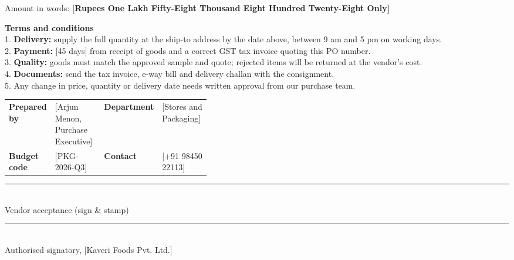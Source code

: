 \documentclass[10pt]{article}
\begin{document}
\par

\vspace{4pt}

Amount in words: \textbf{[Rupees One Lakh Fifty-Eight Thousand Eight Hundred Twenty-Eight Only]}\par\vspace{4pt}

\noindent\colorbox{notebg}{\parbox{\dimexpr\linewidth-2\fboxsep}{\footnotesize {\color{accent}\bfseries Terms and conditions}\\ 1. \textbf{Delivery:} supply the full quantity at the ship-to address by the date above, between 9 am and 5 pm on working days.\\ 2. \textbf{Payment:} [45 days] from receipt of goods and a correct GST tax invoice quoting this PO number.\\ 3. \textbf{Quality:} goods must match the approved sample and quote; rejected items will be returned at the vendor's cost.\\ 4. \textbf{Documents:} send the tax invoice, e-way bill and delivery challan with the consignment.\\ 5. Any change in price, quantity or delivery date needs written approval from our purchase team.}}\par\vspace{6pt}

\begin{tabularx}{\linewidth}{@{}p{0.2\linewidth}X p{0.2\linewidth}X@{}}
\textbf{Prepared by} & [Arjun Menon, Purchase Executive] & \textbf{Department} & [Stores and Packaging] \\
\textbf{Budget code} & [PKG-2026-Q3] & \textbf{Contact} & [+91 98450 22113] \\
\end{tabularx}\par\vspace{2pt}

\vspace{32pt}\noindent\parbox[t]{0.3\linewidth}{\centering\rule{\linewidth}{0.5pt}\\ Vendor acceptance (sign \& stamp)}\hfill\parbox[t]{0.3\linewidth}{\centering\rule{\linewidth}{0.5pt}\\ Authorised signatory, [Kaveri Foods Pvt. Ltd.]}\par
\end{document}
